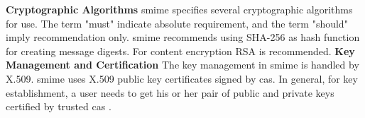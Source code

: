 \textbf{Cryptographic Algorithms}
\newline
\acrshort{smime} specifies several cryptographic algorithms for use. The term "must" indicate absolute requirement, and the term "should" imply recommendation only. \acrshort{smime} recommends using SHA-256 as hash function for creating message digests. For content encryption RSA is recommended.
\newline
\newline
\textbf{Key Management and Certification}
\newline
The key management in \acrshort{smime} is handled by X.509. \acrshort{smime} uses X.509 public key certificates signed by \acrshort{ca}s. In general, for key establishment, a user needs to get his or her pair of public and private keys certified by trusted \acrshort{ca}s \cite{SEmailETU}.
